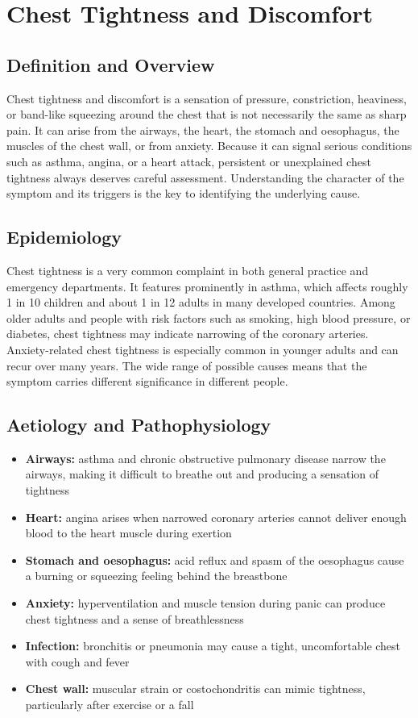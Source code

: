 \chapter{Chest Tightness and Discomfort}

\section*{Definition and Overview}
Chest tightness and discomfort is a sensation of pressure, constriction, heaviness, or band-like squeezing around the chest that is not necessarily the same as sharp pain. It can arise from the airways, the heart, the stomach and oesophagus, the muscles of the chest wall, or from anxiety. Because it can signal serious conditions such as asthma, angina, or a heart attack, persistent or unexplained chest tightness always deserves careful assessment. Understanding the character of the symptom and its triggers is the key to identifying the underlying cause.

\section*{Epidemiology}
Chest tightness is a very common complaint in both general practice and emergency departments. It features prominently in asthma, which affects roughly 1 in 10 children and about 1 in 12 adults in many developed countries. Among older adults and people with risk factors such as smoking, high blood pressure, or diabetes, chest tightness may indicate narrowing of the coronary arteries. Anxiety-related chest tightness is especially common in younger adults and can recur over many years. The wide range of possible causes means that the symptom carries different significance in different people.

\section*{Aetiology and Pathophysiology}
\begin{itemize}
    \item \textbf{Airways:} asthma and chronic obstructive pulmonary disease narrow the airways, making it difficult to breathe out and producing a sensation of tightness
    \item \textbf{Heart:} angina arises when narrowed coronary arteries cannot deliver enough blood to the heart muscle during exertion
    \item \textbf{Stomach and oesophagus:} acid reflux and spasm of the oesophagus cause a burning or squeezing feeling behind the breastbone
    \item \textbf{Anxiety:} hyperventilation and muscle tension during panic can produce chest tightness and a sense of breathlessness
    \item \textbf{Infection:} bronchitis or pneumonia may cause a tight, uncomfortable chest with cough and fever
    \item \textbf{Chest wall:} muscular strain or costochondritis can mimic tightness, particularly after exercise or a fall
\end{itemize}

